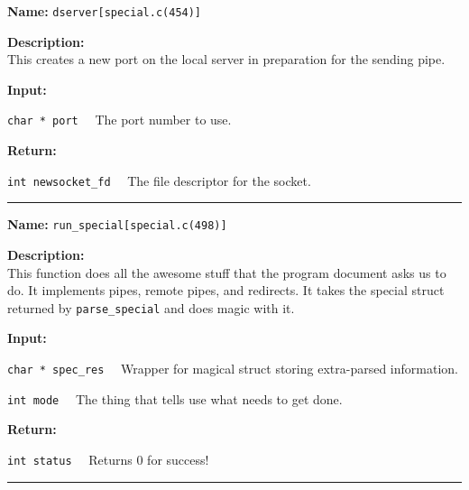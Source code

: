 \documentclass[11pt,a4paper]{article}
\begin{document}
\begin{description}
\item \textbf{Name:} 
\verb|dserver[special.c(454)]|

\item \textbf{Description:}\\
This creates a new port on the local server in preparation for the sending pipe.

\item \textbf{Input:}
\begin{description}
\item \verb|char * port|~~ The port number to use.
\end{description}

\item \textbf{Return:}
\begin{description}
\item \verb|int newsocket_fd|~~ The file descriptor for the socket.
\end{description}
\end{description}\hrule

\begin{description}
\item \textbf{Name:} 
\verb|run_special[special.c(498)]|

\item \textbf{Description:}\\
This function does all the awesome stuff that the program document asks us to do. It implements pipes, remote pipes, and redirects. It takes the special struct returned by \verb|parse_special| and does magic with it.

\item \textbf{Input:}
\begin{description}
\item \verb|char * spec_res|~~ Wrapper for magical struct storing extra-parsed information.
\item \verb|int mode|~~ The thing that tells use what needs to get done.
\end{description}

\item \textbf{Return:}
\begin{description}
\item \verb|int status|~~ Returns 0 for success!
\end{description}
\end{description}\hrule
\end{document}

